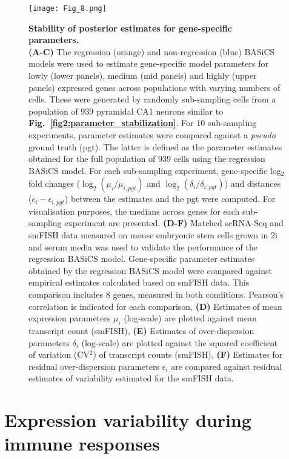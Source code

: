\begin{figure}[!h]
\centering
\texttt{[image: Fig\_8.png]}
\caption[Stability of posterior estimates for gene-specific parameters]{\textbf{Stability of posterior estimates for gene-specific parameters.}\\
\textbf{(A-C)} The regression (orange) and non-regression (blue) BASiCS models were used to estimate gene-specific model parameters for lowly (lower panels), medium (mid panels) and highly (upper panels) expressed genes across populations with varying numbers of cells. These were generated by randomly sub-sampling cells from a population of 939 pyramidal CA1 neurons \citep{Zeisel2015} similar to \textbf{Fig.~\ref{fig2:parameter_stabilization}}. For 10 sub-sampling experiments, parameter estimates were compared against a \textit{pseudo} ground truth (pgt). The latter is defined as the parameter estimates obtained for the full population of 939 cells using the regression BASiCS model. For each sub-sampling experiment, gene-specific log$_2$ fold changes ($\log_2(\mu_i/\mu_{i,pgt})$ and $\log_2(\delta_i/\delta_{i,pgt})$) and distances ($\epsilon_i - \epsilon_{i,pgt}$) between the estimates and the pgt were computed. For visualisation purposes, the medians across genes for each sub-sampling experiment are presented, \textbf{(D-F)} Matched scRNA-Seq and smFISH data measured on mouse embryonic stem cells grown in 2i and serum media \citep{Grun2014} was used to validate the performance of the regression BASiCS model. Gene-specific parameter estimates obtained by the regression BASiCS model were compared against empirical estimates calculated based on smFISH data. This comparison includes 8 genes, measured in both conditions. Pearson's correlation is indicated for each comparison, \textbf{(D)} Estimates of mean expression parameters $\mu_i$ (log-scale) are plotted against mean transcript count (smFISH), \textbf{(E)} Estimates of over-dispersion parameters $\delta_i$ (log-scale) are plotted against the squared coefficient of variation (CV$^2$) of transcript counts (smFISH), \textbf{(F)} Estimates for residual over-dispersion parameters $\epsilon_i$ are compared against residual estimates of variability estimated for the smFISH data.}
\label{fig2:parameter_stabilization2}
\end{figure}

\newpage

\section{Expression variability during immune responses}

